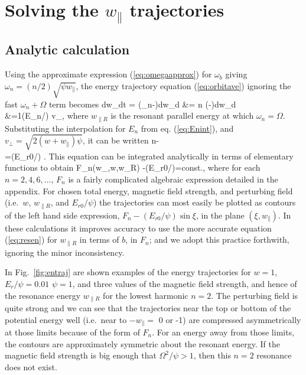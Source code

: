 \documentclass{agujournal2019}
\let\oldequation\equation
\let\oldendequation\endequation
\renewenvironment{equation}
  {\linenomathNonumbers\oldequation}
  {\oldendequation\endlinenomath}
\let\oldalign\align
\let\oldendalign\endalign
\renewenvironment{align}
  {\linenomathNonumbers\oldalign}
  {\oldendalign\endlinenomath}
\def\wp{w_\parallel}
\def\wr{w_{\parallel R}}
\begin{document}
\section{Solving the $\wp$ trajectories}

\subsection{Analytic calculation}

Using the approximate expression (\ref{eq:omegaapprox}) for $\omega_b$
giving $\omega_n=(n/2)\sqrt{\psi \wp}$, the energy trajectory
equation (\ref{eq:orbitave}) ignoring the fast $\omega_n+\Omega$ term becomes
\begin{align}
  \label{eq:combinedtraj}
  {d\wp \over dt}
  = (\omega_n-\Omega){d\wp \over d\xi}
  &=  {n\sqrt{\psi}} (\sqrt{\wp}-\sqrt{\wr }){d\wp \over d\xi}
\nonumber\\
  &={1}(E_n/\psi) v_\perp \cos\xi,
\end{align}
where $\wr$ is the resonant parallel energy at which
$\omega_n=\Omega$. Substituting the interpolation for $E_n$ from
eq. (\ref{eq:Enint}), and $v_\perp=\sqrt{2(w+\wp)\psi}$, it can be written
\begin{align}
  \label{eq:combtraj1}
  n{\sqrt{\wp}-\sqrt{\wr }\over{} \sqrt{w+\wp}}
   \left[{n/2\over (1-\sqrt{\wp})^{n/2}} + 
     {\pi\over8}{1\over\sqrt{\wp}}\right]
   {d\wp \over d\xi}\nonumber\\
  =(E_{r0}/\psi) \cos\xi.
\end{align}
This equation can be integrated analytically in terms of elementary
functions to obtain
\begin{equation}
  \label{eq:w2solution}
  F_n(\wp,w,\wr ) -(E_{r0}/\psi)\sin\xi=const.,
\end{equation}
where for each $n=2,4,6,\dots$, $F_n$ is a fairly complicated
algebraic expression detailed in the appendix.  For chosen total
energy, magnetic field strength, and perturbing field (i.e.\ $w$,
$\wr $, and $E_{r0}/\psi$) the trajectories can most easily be plotted
as contours of the left hand side expression,
$F_n-(E_{r0}/\psi)\sin\xi$, in the plane $(\xi,\wp)$. In these
calculations it improves accuracy to use the more accurate equation
(\ref{eq:resen}) for $\wr$ in terms of $b$, in $F_n$; and we adopt
this practice forthwith, ignoring the minor inconsistency.

\label{illusfig}
In Fig.\ \ref{fig:entraj} are shown examples of the energy
trajectories for $w=1$, $E_r/\psi=0.01$ $\psi=1$, and three values of the
magnetic field strength, and hence of the resonance energy $\wr $ for
the lowest harmonic $n=2$.  
The perturbing field is quite strong and we can see
that the trajectories near the top or bottom of the potential energy
well (i.e.\ near to $-\wp =$ 0 or -1) are compressed asymmetrically at
those limits because of the form of $F_n$. For an energy away from
those limits, the contours are approximately symmetric about the
resonant energy. If the magnetic field strength is big enough that
$\Omega^2/\psi >1$, then this $n=2$ resonance does not exist.
\end{document}
